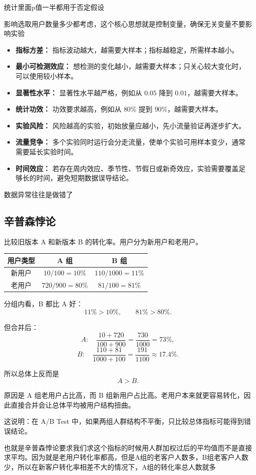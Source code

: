 \begin{dxtips}
    统计里面p值一半都用于否定假设
\end{dxtips}
\begin{dxtips}
    影响选取用户数量多少都考虑，这个核心思想就是控制变量，确保无关变量不要影响实验
\end{dxtips}
\begin{itemize}
    \item \textbf{指标方差：} 指标波动越大，越需要大样本；指标越稳定，所需样本越小。
    \item \textbf{最小可检测效应：} 想检测的变化越小，越需要大样本；只关心较大变化时，可以使用较小样本。
    \item \textbf{显著性水平：} 显著性水平越严格，例如从 $0.05$ 降到 $0.01$，越需要大样本。
    \item \textbf{统计功效：} 功效要求越高，例如从 $80\%$ 提到 $90\%$，越需要大样本。
    \item \textbf{实验风险：} 风险越高的实验，初始放量应越小，先小流量验证再逐步扩大。
    \item \textbf{流量竞争：} 多个实验同时运行会分走流量，使单个实验可用样本变少，通常需要延长实验时间。
    \item \textbf{时间效应：} 若存在周内效应、季节性、节假日或新奇效应，实验需要覆盖足够长的时间，避免短期数据误导结论。
\end{itemize}
\begin{definition} [魏特曼定理]
    数据异常往往是做错了
\end{definition}
\subsection{辛普森悖论}
\begin{example}[辛普森悖论]
比较旧版本 A 和新版本 B 的转化率。用户分为新用户和老用户。

\begin{center}
\begin{tabular}{c|cc}
\hline
用户类型 & A 组 & B 组 \\
\hline
新用户 & $10/100=10\%$ & $110/1000=11\%$ \\
老用户 & $720/900=80\%$ & $81/100=81\%$ \\
\hline
\end{tabular}
\end{center}

分组内看，B 都比 A 好：
\[
11\%>10\%, \qquad 81\%>80\%.
\]

但合并后：
\[
A:\quad \frac{10+720}{100+900}
= \frac{730}{1000}
= 73\%,
\]
\[
B:\quad \frac{110+81}{1000+100}
= \frac{191}{1100}
\approx 17.4\%.
\]

所以总体上反而是
\[
A>B.
\]

原因是 A 组老用户占比高，而 B 组新用户占比高。老用户本来就更容易转化，因此直接合并会让总体平均被用户结构扭曲。

这说明：在 A/B Test 中，如果两组人群结构不平衡，只比较总体指标可能得到错误结论。
\end{example}
\begin{dxtips}
    也就是辛普森悖论要求我们求这个指标的时候用人群加权过后的平均值而不是直接求平均。因为就是老用户转化率都高，但是A组的老客户人数多，B组老客户人数少，所以在新客户转化率相差不大的情况下，A组的转化率总人数就多
\end{dxtips}
